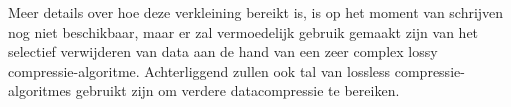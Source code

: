 Meer details over hoe deze verkleining bereikt is, is op het moment van schrijven nog niet beschikbaar, maar er zal vermoedelijk gebruik gemaakt zijn van het selectief verwijderen van data aan de hand van een zeer complex \gls{lossy} \gls{compressie-algoritme}. Achterliggend zullen ook tal van \gls{lossless} \glspl{compressie-algoritme} gebruikt zijn om verdere \gls{datacompressie} te bereiken.